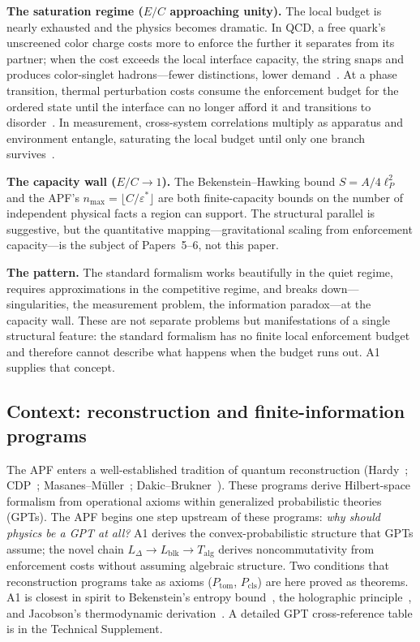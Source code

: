 \documentclass[11pt]{article}
\theoremstyle{remark}
\begin{document}
\medskip\noindent\textbf{The saturation regime ($E/C$ approaching unity).}
The local budget is nearly exhausted and the physics becomes dramatic.  In QCD, a free quark's unscreened color charge costs more to enforce the further it separates from its partner; when the cost exceeds the local interface capacity, the string snaps and produces color-singlet hadrons---fewer distinctions, lower demand~\cite{Wilson1974}.  At a phase transition, thermal perturbation costs consume the enforcement budget for the ordered state until the interface can no longer afford it and transitions to disorder~\cite{Wilson1983}.  In measurement, cross-system correlations multiply as apparatus and environment entangle, saturating the local budget until only one branch survives~\cite{Zurek1981}.

\medskip\noindent\textbf{The capacity wall ($E/C \to 1$).}
The Bekenstein--Hawking bound $S = A/4\ell_P^2$~\cite{Bekenstein1981} and the APF's $n_{\max} = \lfloor C/\varepsilon^* \rfloor$ are both finite-capacity bounds on the number of independent physical facts a region can support.  The structural parallel is suggestive, but the quantitative mapping---gravitational scaling from enforcement capacity---is the subject of Papers~5--6, not this paper.

\medskip\noindent\textbf{The pattern.}  The standard formalism works beautifully in the quiet regime, requires approximations in the competitive regime, and breaks down---singularities, the measurement problem, the information paradox---at the capacity wall.  These are not separate problems but manifestations of a single structural feature: the standard formalism has no finite local enforcement budget and therefore cannot describe what happens when the budget runs out.  A1 supplies that concept.

\subsection{Context: reconstruction and finite-information programs}
\label{sec:context}

The APF enters a well-established tradition of quantum reconstruction (Hardy~\cite{Hardy2001}; CDP~\cite{CDP2011}; Masanes--M\"uller~\cite{MM2011}; Dakic--Brukner~\cite{DakicBrukner2009}).  These programs derive Hilbert-space formalism from operational axioms within generalized probabilistic theories (GPTs).  The APF begins one step upstream of these programs: \emph{why should physics be a GPT at all?}  A1 derives the convex-probabilistic structure that GPTs assume; the novel chain $L_\Delta \to L_{\mathrm{blk}} \to T_{\mathrm{alg}}$ derives noncommutativity from enforcement costs without assuming algebraic structure.  Two conditions that reconstruction programs take as axioms ($P_{\mathrm{tom}}$, $P_{\mathrm{cls}}$) are here proved as theorems.  A1 is closest in spirit to Bekenstein's entropy bound~\cite{Bekenstein1981}, the holographic principle~\cite{tHooft1993,Susskind1995}, and Jacobson's thermodynamic derivation~\cite{Jacobson1995}.  A detailed GPT cross-reference table is in the Technical Supplement.
\end{document}
